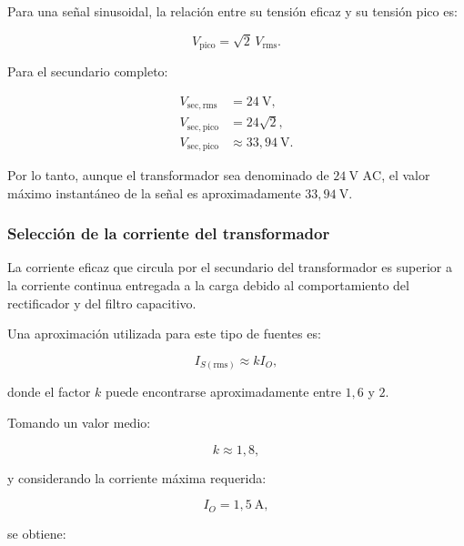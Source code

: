 \documentclass[12pt,a4paper]{article}
\begin{document}
	Para una señal sinusoidal, la relación entre su tensión eficaz y su tensión pico
	es:
	
	\begin{equation}
		V_{\mathrm{pico}}
		=
		\sqrt{2}\,V_{\mathrm{rms}}.
	\end{equation}
	
	Para el secundario completo:
	
	\begin{align}
		V_{\mathrm{sec,rms}}
		&=
		24~\text{V},
		\\[0.2cm]
		V_{\mathrm{sec,pico}}
		&=
		24\sqrt{2},
		\\
		V_{\mathrm{sec,pico}}
		&\approx
		33,94~\text{V}.
	\end{align}
	
	Por lo tanto, aunque el transformador sea denominado de $24~\text{V AC}$,
	el valor máximo instantáneo de la señal es aproximadamente $33,94~\text{V}$.
	
	\subsubsection{Selección de la corriente del transformador}
	
	La corriente eficaz que circula por el secundario del transformador es superior
	a la corriente continua entregada a la carga debido al comportamiento del
	rectificador y del filtro capacitivo.
	
	Una aproximación utilizada para este tipo de fuentes es:
	
	\begin{equation}
		I_{S(\mathrm{rms})}
		\approx
		kI_O,
	\end{equation}
	
	donde el factor $k$ puede encontrarse aproximadamente entre $1,6$ y $2$.
	
	Tomando un valor medio:
	
	\begin{equation}
		k\approx1,8,
	\end{equation}
	
	y considerando la corriente máxima requerida:
	
	\begin{equation}
		I_O=1,5~\text{A},
	\end{equation}
	
	se obtiene:
	
\end{document}

